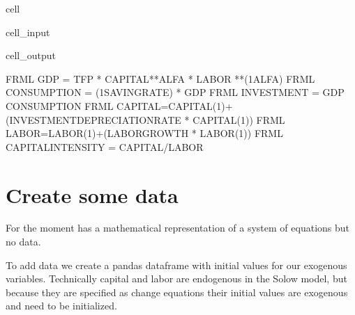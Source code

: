 \documentclass[letterpaper,10pt,english]{jupyterBook}
\begin{document}
\begin{sphinxuseclass}{cell}\begin{sphinxVerbatimInput}

\begin{sphinxuseclass}{cell_input}
\begin{sphinxVerbatim}[commandchars=\\\{\}]
\end{sphinxVerbatim}

\end{sphinxuseclass}\end{sphinxVerbatimInput}
\begin{sphinxVerbatimOutput}

\begin{sphinxuseclass}{cell_output}
\begin{sphinxVerbatim}[commandchars=\\\{\}]
FRML \PYGZlt{}\PYGZgt{} GDP          = TFP  * CAPITAL**ALFA * LABOR **(1\PYGZhy{}ALFA)  \PYGZdl{}
FRML \PYGZlt{}\PYGZgt{} CONSUMPTION     = (1\PYGZhy{}SAVING\PYGZus{}RATE)  * GDP  \PYGZdl{}
FRML \PYGZlt{}\PYGZgt{} INVESTMENT      = GDP \PYGZhy{} CONSUMPTION    \PYGZdl{}
FRML \PYGZlt{}\PYGZgt{} CAPITAL=CAPITAL(\PYGZhy{}1)+(INVESTMENT\PYGZhy{}DEPRECIATION\PYGZus{}RATE * CAPITAL(\PYGZhy{}1))\PYGZdl{}
FRML \PYGZlt{}\PYGZgt{} LABOR=LABOR(\PYGZhy{}1)+(LABOR\PYGZus{}GROWTH * LABOR(\PYGZhy{}1))\PYGZdl{}
FRML \PYGZlt{}\PYGZgt{} CAPITAL\PYGZus{}INTENSITY = CAPITAL/LABOR  \PYGZdl{}
\end{sphinxVerbatim}

\end{sphinxuseclass}\end{sphinxVerbatimOutput}

\end{sphinxuseclass}

\section{Create some data}
\label{\detokenize{content/03_Installation/TestingModelFlow:create-some-data}}
\sphinxAtStartPar
For the moment  has a mathematical representation of a system of equations but no data.

\sphinxAtStartPar
To add data we  create a pandas dataframe with initial values for our exogenous variables. Technically capital and labor are endogenous in the Solow model, but because they are specified as change equations their initial values are exogenous and need to be initialized.
\end{document}
